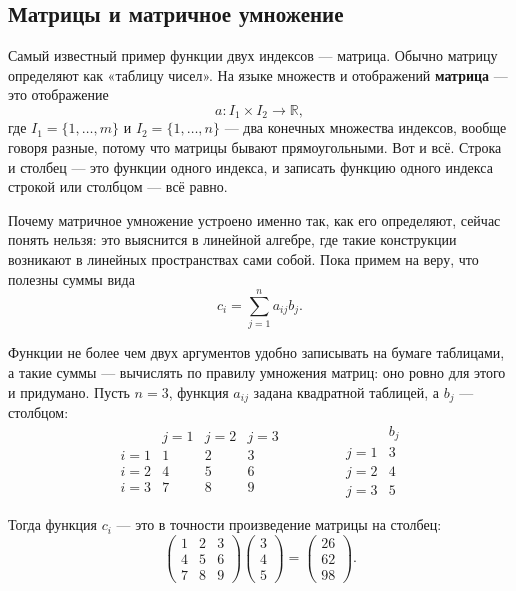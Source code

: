 \documentclass[11pt,a4paper]{article}
\begin{document}
\subsection{Матрицы и матричное умножение}

Самый известный пример функции двух индексов — матрица. Обычно матрицу определяют как «таблицу чисел». На языке множеств и отображений \textbf{матрица} — это отображение
\[
a\colon I_1 \times I_2 \to \mathbb{R},
\]
где $I_1 = \{1, \dots, m\}$ и $I_2 = \{1, \dots, n\}$ — два конечных множества индексов, вообще говоря разные, потому что матрицы бывают прямоугольными. Вот и всё. Строка и столбец — это функции одного индекса, и записать функцию одного индекса строкой или столбцом — всё равно.

Почему матричное умножение устроено именно так, как его определяют, сейчас понять нельзя: это выяснится в линейной алгебре, где такие конструкции возникают в линейных пространствах сами собой. Пока примем на веру, что полезны суммы вида
\[
c_i = \sum_{j=1}^{n} a_{ij} b_j.
\]

Функции не более чем двух аргументов удобно записывать на бумаге таблицами, а такие суммы — вычислять по правилу умножения матриц: оно ровно для этого и придумано. Пусть $n = 3$, функция $a_{ij}$ задана квадратной таблицей, а $b_j$ — столбцом:
\[
\begin{array}{c|ccc}
 & j=1 & j=2 & j=3 \\ \hline
i=1 & 1 & 2 & 3 \\
i=2 & 4 & 5 & 6 \\
i=3 & 7 & 8 & 9
\end{array}
\qquad\qquad
\begin{array}{c|c}
 & b_j \\ \hline
j=1 & 3 \\
j=2 & 4 \\
j=3 & 5
\end{array}
\]

Тогда функция $c_i$ — это в точности произведение матрицы на столбец:
\[
\begin{pmatrix} 1 & 2 & 3 \\ 4 & 5 & 6 \\ 7 & 8 & 9 \end{pmatrix}
\begin{pmatrix} 3 \\ 4 \\ 5 \end{pmatrix}
=
\begin{pmatrix} 26 \\ 62 \\ 98 \end{pmatrix}.
\]
\end{document}

